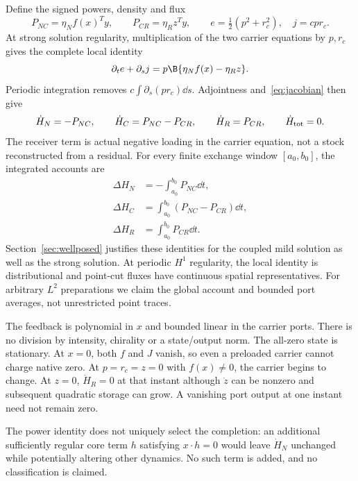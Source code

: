 Define the signed powers, density and flux
\begin{equation}\label{eq:powers}
 P_{NC}=\eta_N f(x)^Ty,\qquad P_{CR}=\eta_R z^Ty,\qquad
 e=\tfrac12(p^2+r_c^2),\quad j=cpr_c.
\end{equation}
At strong solution regularity, multiplication of the two carrier equations by $p,r_c$ gives the complete local identity
\begin{equation}\label{eq:localwork}
 \partial_t e+\partial_s j=p\B\{\eta_Nf(x)-\eta_Rz\}.
\end{equation}
Periodic integration removes $c\int\partial_s(pr_c)\dd s$. Adjointness and~\eqref{eq:jacobian} then give
\begin{equation}\label{eq:balances}
 \dot H_N=-P_{NC},\qquad \dot H_C=P_{NC}-P_{CR},\qquad
 \dot H_R=P_{CR},\qquad \dot H_{\rm tot}=0.
\end{equation}
The receiver term is actual negative loading in the carrier equation, not a stock reconstructed from a residual. For every finite exchange window $[a_0,b_0]$, the integrated accounts are
\begin{equation}\label{eq:integrated}
\begin{aligned}
 \Delta H_N&=-\int_{a_0}^{b_0}P_{NC}\dd t,\\
 \Delta H_C&=\int_{a_0}^{b_0}(P_{NC}-P_{CR})\dd t,\\
 \Delta H_R&=\int_{a_0}^{b_0}P_{CR}\dd t.
\end{aligned}
\end{equation}
Section~\ref{sec:wellposed} justifies these identities for the coupled mild solution as well as the strong solution. At periodic $H^1$ regularity, the local identity is distributional and point-cut fluxes have continuous spatial representatives. For arbitrary $L^2$ preparations we claim the global account and bounded port averages, not unrestricted point traces.

The feedback is polynomial in $x$ and bounded linear in the carrier ports. There is no division by intensity, chirality or a state/output norm. The all-zero state is stationary. At $x=0$, both $f$ and $J$ vanish, so even a preloaded carrier cannot charge native zero. At $p=r_c=z=0$ with $f(x)\ne0$, the carrier begins to change. At $z=0$, $\dot H_R=0$ at that instant although $\dot z$ can be nonzero and subsequent quadratic storage can grow. A vanishing port output at one instant need not remain zero.

The power identity does not uniquely select the completion: an additional sufficiently regular core term $h$ satisfying $x\cdot h=0$ would leave $\dot H_N$ unchanged while potentially altering other dynamics. No such term is added, and no classification is claimed.
